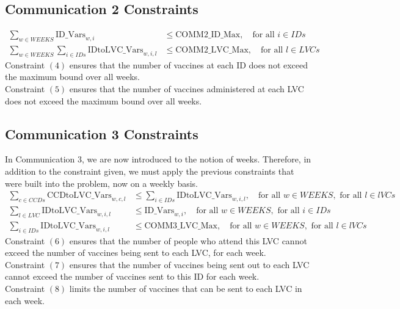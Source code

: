 \documentclass[12pt]{article}
\begin{document}
    \subsection{Communication 2 Constraints}
        \begin{align}
            \displaystyle\sum_{w\in WEEKS} \text{ID\_Vars}_{w,i} &\le \text{COMM2\_ID\_Max}, \quad \text{for all } i \in IDs\\
            \displaystyle\sum_{w\in WEEKS}\displaystyle\sum_{i\in IDs}\text{IDtoLVC\_Vars}_{w,i,l} &\le \text{COMM2\_LVC\_Max}, \quad \text{for all } l \in LVCs
        \end{align}
        Constraint \((4)\) ensures that the number of vaccines at each ID does not exceed the maximum bound over all weeks.\\
        Constraint \((5)\) ensures that the number of vaccines administered at each LVC does not exceed the maximum bound over all weeks.
    \subsection{Communication 3 Constraints}
	In Communication \(3\), we are now introduced to the notion of weeks. Therefore, in addition to the constraint given, we must apply the previous constraints that were built into the problem, now on a weekly basis.
        \begin{align}
            \displaystyle\sum_{c\in CCDs} \text{CCDtoLVC\_Vars}_{w,c,l} &\le \displaystyle\sum_{i \in IDs} \text{IDtoLVC\_Vars}_{w,i,l}, \quad \text{for all } w \in WEEKS, \text{ for all } l \in lVCs\\
            \displaystyle\sum_{l\in LVC}\text{IDtoLVC\_Vars}_{w,i,l} &\le \text{ID\_Vars}_{w,i}, \quad \text{for all } w \in WEEKS, \text{ for all } i \in IDs\\
            \displaystyle\sum_{i \in IDs} \text{IDtoLVC\_Vars}_{w,i,l} &\le \text{COMM3\_LVC\_Max}, \quad \text{for all } w \in WEEKS, \text{ for all } l \in lVCs
        \end{align}
        Constraint \((6)\) ensures that the number of people who attend this LVC cannot exceed the number of vaccines being sent to each LVC, for each week.\\
        Constraint \((7)\) ensures that the number of vaccines being sent out to each LVC cannot exceed the number of vaccines sent to this ID for each week.\\
	Constraint \((8)\) limits the number of vaccines that can be sent to each LVC in each week.
\end{document}
